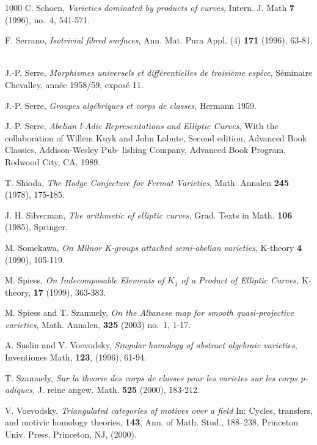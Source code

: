 \documentclass[12pt]{amsart}
\theoremstyle{remark}
\renewcommand{\1}{{\mathbb{S}}}
\newcommand{\<}{\langle}
\renewcommand{\>}{\rangle}
\begin{document}
\begin{thebibliography}{1000}
 C. Schoen, {\sl Varieties dominated by products of curves}, Intern. J. Math \textbf{7} (1996), no.~4, 541-571.  \ 

 F. Serrano, {\sl Isotrivial fibred surfaces\/}, Ann. Mat. Pura Appl. (4) \textbf{171} (1996), 63-81. \
			
 J.-P. Serre, {\sl Morphismes universels et diff\'{e}rentielles de troisi\`{e}me esp\`{e}ce\/}, S\'{e}minaire Chevalley, ann\'{e}e 1958/59, expos\'{e} 11. \ 

 J.-P. Serre, {\sl Groupes alg\'{e}briques et corps de classes\/}, Hermann 1959.  \ 

 J.-P. Serre, {\sl Abelian l-Adic Representations and Elliptic Curves\/}, With the collaboration of
Willem Kuyk and John Labute, Second edition, Advanced Book Classics, Addison-Wesley Pub-
lishing Company, Advanced Book Program, Redwood City, CA, 1989.  \ 

 T. Shioda, {\sl The Hodge Conjecture for Fermat Varieties\/}, Math. Annalen \textbf{245} (1978), 175-185. \ 



 J. H. Silverman, {\sl The arithmetic of elliptic curves\/}, Grad. Texts in Math. \textbf{106} (1985), Springer. \


 M. Somekawa, {\sl On Milnor K-groups attached semi-abelian varieties\/}, K-theory \textbf{4} (1990), 105-119. \ 

 M. Spiess,  
{\sl On Indecomposable Elements of $K_1$ of a Product of Elliptic Curves,\/} K-theory, \textbf{17} (1999), 363-383.\
		
 M. Spiess and T. Szamuely, {\sl On the Albanese map for smooth quasi-projective varieties\/}, Math. Annalen, \textbf{325} (2003) no.~1, 1-17.  \ 


 A. Suslin and V. Voevodsky, {\sl Singular homology of abstract algebraic varieties\/}, Inventiones Math, \textbf{123}, (1996), 61-94. \ 

 T. Szamuely, {\sl Sur la theorie des corps de classes
pour les varietes sur les corps p-adiques, \/} J. reine angew. Math. \textbf{525} (2000), 183-212.



 V. Voevodsky, {\sl  Triangulated categories of motives over a field\/} In: Cycles, transfers, and motivic
homology theories, \textbf{143}, Ann. of Math. Stud., 188–238, Princeton Univ. Press, Princeton, NJ, (2000).  \ 


\end{thebibliography}
\end{document}
